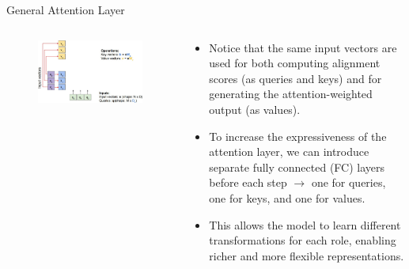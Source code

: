 \begin{frame}[allowframebreaks]{General Attention Layer}
    \begin{columns}
    \begin{column}{0.6\textwidth}
        \begin{figure}
            \flushleft
            \includegraphics[width=\linewidth,height=\textheight,keepaspectratio]{images/transformers/slide_39_1_img.jpg}
        \end{figure}
    \end{column}
    \begin{column}{0.5\textwidth}
        \begin{itemize}
            \item Notice that the same input vectors are used for both computing alignment scores (as queries and keys) and for generating the attention-weighted output (as values).
            \item To increase the expressiveness of the attention layer, we can introduce separate fully connected (FC) layers before each step $\rightarrow$ one for queries, one for keys, and one for values.
            \item This allows the model to learn different transformations for each role, enabling richer and more flexible representations.
        \end{itemize}
    \end{column}
    \end{columns}

    \framebreak


\end{frame}
